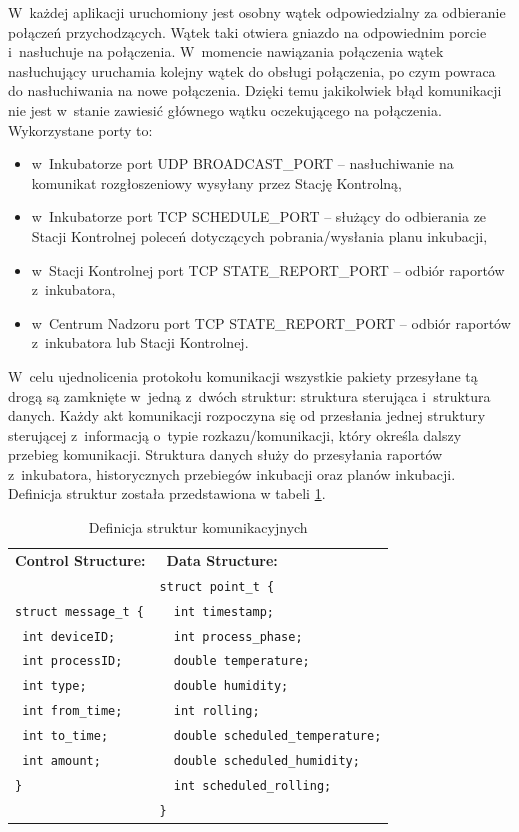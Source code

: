 W~każdej aplikacji uruchomiony jest osobny wątek odpowiedzialny za
odbieranie połączeń przychodzących. Wątek taki otwiera gniazdo na odpowiednim
porcie i~nasłuchuje na połączenia. W~momencie nawiązania połączenia wątek
nasłuchujący uruchamia kolejny wątek do obsługi połączenia, po czym powraca do
nasłuchiwania na nowe połączenia. Dzięki temu jakikolwiek błąd komunikacji nie
jest w~stanie zawiesić głównego wątku oczekującego na połączenia. Wykorzystane
porty to:
\begin{itemize}
	\item w~Inkubatorze port UDP BROADCAST\_PORT -- nasłuchiwanie na komunikat
		rozgłoszeniowy wysyłany przez Stację Kontrolną,
	\item w~Inkubatorze port TCP SCHEDULE\_PORT -- służący do odbierania ze Stacji
		Kontrolnej poleceń dotyczących pobrania/wysłania planu inkubacji, 
	\item w~Stacji Kontrolnej port TCP STATE\_REPORT\_PORT -- odbiór raportów
	z~inkubatora,
	\item w~Centrum Nadzoru port TCP STATE\_REPORT\_PORT -- odbiór raportów
	z~inkubatora lub Stacji Kontrolnej.
\end{itemize}

W~celu ujednolicenia protokołu komunikacji wszystkie pakiety przesyłane tą drogą
są zamknięte w~jedną z~dwóch struktur: struktura sterująca i~struktura danych.
Każdy akt komunikacji rozpoczyna się od przesłania jednej struktury sterującej
z~informacją o~typie rozkazu/komunikacji, który określa dalszy przebieg
komunikacji. Struktura danych służy do przesyłania raportów z~inkubatora,
historycznych przebiegów inkubacji oraz planów inkubacji. Definicja struktur
została przedstawiona w tabeli \ref{tab:Struktury}.
\begin{table}[t]
	\centering
	\begin{tabular}{m{7cm}|m{7cm}}
		\textbf{Control Structure:} &~\textbf{Data Structure:} \\
		& \verb+struct point_t {+ \\
		\verb+struct message_t {+ &~\verb+ int timestamp;+ \\
		\verb+ int deviceID;+ &~\verb+ int process_phase;+ \\
		\verb+ int processID;+ &~\verb+ double temperature;+ \\
		\verb+ int type;+ &~\verb+ double humidity;+ \\
		\verb+ int from_time;+ &~\verb+ int rolling;+ \\
		\verb+ int to_time;+ &~\verb+ double scheduled_temperature;+ \\
		\verb+ int amount;+ &~\verb+ double scheduled_humidity;+ \\
		\verb+}+ &~\verb+ int scheduled_rolling;+ \\
		& \verb+}+ \\
	\end{tabular}
	\caption{Definicja struktur komunikacyjnych}
	\label{tab:Struktury}
\end{table}

